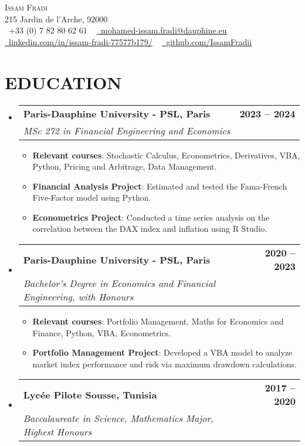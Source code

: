 \documentclass[letterpaper,11pt]{article}
\makeatletter
\newcommand{\resumeItem}[1]{
  \item\small{
    {#1 \vspace{-2pt}}
  }
}
\newcommand{\resumeSubheading}[4]{
  \vspace{-2pt}\item
    \begin{tabular*}{1.0\textwidth}[t]{l@{\extracolsep{\fill}}r}
      \textbf{#1} & \textbf{\small #2} \\
      \textit{\small#3} & \textit{\small #4} \\
    \end{tabular*}\vspace{-7pt}
}
\newcommand{\resumeSubHeadingListStart}{\begin{itemize}[leftmargin=0.0in, label={}]}
\newcommand{\resumeSubHeadingListEnd}{\end{itemize}}
\newcommand{\resumeItemListStart}{\begin{itemize}}
\newcommand{\resumeItemListEnd}{\end{itemize}\vspace{-5pt}}
\makeatother
\begin{document}


\begin{center}
    {\Huge \scshape Issam Fradi} \\ \vspace{1pt}
    215 Jardin de l'Arche, 92000 \\ \vspace{1pt}
    \small \raisebox{-0.1\height}\faPhone\ +33 (0) 7 82 80 62 61  ~ \href{mailto:x@gmail.com}{\raisebox{-0.2\height}\faEnvelope\  \underline{mohamed-issam.fradi@dauphine.eu}} ~ 
    \href{https://linkedin.com/in//}{\raisebox{-0.2\height}\faLinkedin\ \underline{linkedin.com/in/issam-fradi-77577b179/}}  ~
    \href{https://github.com/}{\raisebox{-0.2\height}\faGithub\ \underline{github.com/IssamFradii}}
\end{center}


\section{EDUCATION}
  \resumeSubHeadingListStart
  
    \resumeSubheading
      {Paris-Dauphine University - PSL, Paris}{2023 -- 2024}
      {MSc 272 in Financial Engineering and Economics}{}
      \resumeItemListStart
        \resumeItem{\textbf{Relevant courses}: Stochastic Calculus, Econometrics, Derivatives, VBA, Python, Pricing and Arbitrage, Data Management.}
        \resumeItem{\textbf{Financial Analysis Project}: Estimated and tested the Fama-French Five-Factor model using Python.}
        \resumeItem{\textbf{Econometrics Project}: Conducted a time series analysis on the correlation between the DAX index and inflation using R Studio.}
      \resumeItemListEnd
      
    \resumeSubheading
      {Paris-Dauphine University - PSL, Paris}{2020 -- 2023}
      {Bachelor’s Degree in Economics and Financial Engineering, with Honours}{}
      \resumeItemListStart
        \resumeItem{\textbf{Relevant courses}: Portfolio Management, Maths for Economics and Finance, Python, VBA, Econometrics.}
        \resumeItem{\textbf{Portfolio Management Project}: Developed a VBA model to analyze market index performance and risk via maximum drawdown calculations.}
      \resumeItemListEnd

    \resumeSubheading
      {Lycée Pilote Sousse, Tunisia}{2017 -- 2020}
      {Baccalaureate in Science, Mathematics Major, Highest Honours}{}
  
  \resumeSubHeadingListEnd
\end{document}
